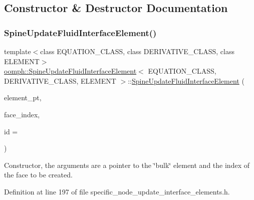 \subsection{Constructor \& Destructor Documentation}
\mbox{\label{classoomph_1_1SpineUpdateFluidInterfaceElement_a2cc44705997f9fb44abf56ddb5f0cde0}} 
\subsubsection{\texorpdfstring{Spine\+Update\+Fluid\+Interface\+Element()}{SpineUpdateFluidInterfaceElement()}}
{\footnotesize\ttfamily template$<$class E\+Q\+U\+A\+T\+I\+O\+N\+\_\+\+C\+L\+A\+SS, class D\+E\+R\+I\+V\+A\+T\+I\+V\+E\+\_\+\+C\+L\+A\+SS, class E\+L\+E\+M\+E\+NT$>$ \\
\hyperlink{classoomph_1_1SpineUpdateFluidInterfaceElement}{oomph\+::\+Spine\+Update\+Fluid\+Interface\+Element}$<$ E\+Q\+U\+A\+T\+I\+O\+N\+\_\+\+C\+L\+A\+SS, D\+E\+R\+I\+V\+A\+T\+I\+V\+E\+\_\+\+C\+L\+A\+SS, E\+L\+E\+M\+E\+NT $>$\+::\hyperlink{classoomph_1_1SpineUpdateFluidInterfaceElement}{Spine\+Update\+Fluid\+Interface\+Element} (\begin{DoxyParamCaption}\item[{Finite\+Element $\ast$const \&}]{element\+\_\+pt,  }\item[{const int \&}]{face\+\_\+index,  }\item[{const unsigned \&}]{id = {} }\end{DoxyParamCaption})\hspace{0.3cm}{\ttfamily [inline]}}



Constructor, the arguments are a pointer to the \char`\"{}bulk\char`\"{} element and the index of the face to be created. 



Definition at line 197 of file specific\+\_\+node\+\_\+update\+\_\+interface\+\_\+elements.\+h.



